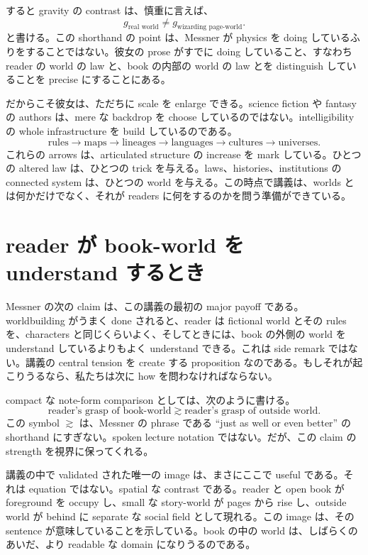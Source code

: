 すると gravity の contrast は、慎重に言えば、
\begin{equation}
g_{\text{real world}} \neq g_{\text{wizarding page-world}}.
\end{equation}
と書ける。この shorthand の point は、Messner が physics を doing しているふりをすることではない。彼女の prose がすでに doing していること、すなわち reader の world の law と、book の内部の world の law とを distinguish していることを precise にすることにある。

だからこそ彼女は、ただちに scale を enlarge できる。science fiction や fantasy の authors は、mere な backdrop を choose しているのではない。intelligibility の whole infrastructure を build しているのである。
\begin{equation}
\text{rules} \to \text{maps} \to \text{lineages} \to \text{languages} \to \text{cultures} \to \text{universes}.
\end{equation}
これらの arrows は、articulated structure の increase を mark している。ひとつの altered law は、ひとつの trick を与える。laws、histories、institutions の connected system は、ひとつの world を与える。この時点で講義は、worlds とは何かだけでなく、それが readers に何をするのかを問う準備ができている。

\section{reader が book-world を understand するとき}

Messner の次の claim は、この講義の最初の major payoff である。worldbuilding がうまく done されると、reader は fictional world とその rules を、characters と同じくらいよく、そしてときには、book の外側の world を understand しているよりもよく understand できる。これは side remark ではない。講義の central tension を create する proposition なのである。もしそれが起こりうるなら、私たちは次に how を問わなければならない。

compact な note-form comparison としては、次のように書ける。
\begin{equation}
\text{reader's grasp of book-world} \gtrsim \text{reader's grasp of outside world}.
\end{equation}
この symbol \(\gtrsim\) は、Messner の phrase である ``just as well or even better'' の shorthand にすぎない。spoken lecture notation ではない。だが、この claim の strength を視界に保ってくれる。

講義の中で validated された唯一の image は、まさにここで useful である。それは equation ではない。spatial な contrast である。reader と open book が foreground を occupy し、small な story-world が pages から rise し、outside world が behind に separate な social field として現れる。この image は、その sentence が意味していることを示している。book の中の world は、しばらくのあいだ、より readable な domain になりうるのである。

